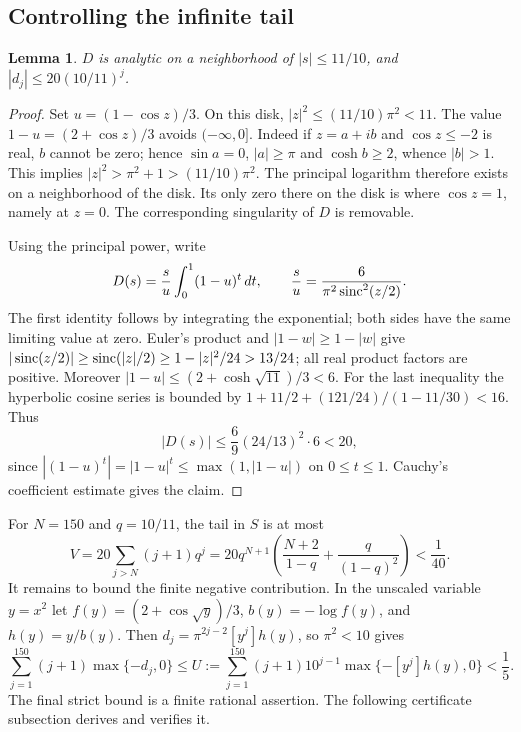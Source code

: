 \documentclass[11pt,a4paper]{article}
\newtheorem{SourceRceSlemma}{Lemma}
\begin{document}
\subsection{Controlling the infinite tail}
\begin{SourceRceSlemma}
$D$ is analytic on a neighborhood of $|s|\le 11/10$, and $|d_j|\le20(10/11)^j$.
\end{SourceRceSlemma}
\begin{proof}
Set $u=(1-\cos z)/3$. On this disk, $|z|^2\le (11/10)\pi^2<11$. The value $1-u=(2+\cos z)/3$ avoids $(-\infty,0]$. Indeed if $z=a+ib$ and $\cos z\le-2$ is real, $b$ cannot be zero; hence $\sin a=0$, $|a|\ge\pi$ and $\cosh b\ge2$, whence $|b|>1$. This implies $|z|^2>\pi^2+1>(11/10)\pi^2$. The principal logarithm therefore exists on a neighborhood of the disk. Its only zero there on the disk is where $\cos z=1$, namely at $z=0$. The corresponding singularity of $D$ is removable.

Using the principal power, write
\[
 D(s)=\frac{s}{u}\int_0^1(1-u)^t\,dt,\qquad
 \frac{s}{u}=\frac{6}{\pi^2\operatorname{sinc}^2(z/2)} .
\]
The first identity follows by integrating the exponential; both sides have the same limiting value at zero. Euler's product and $|1-w|\ge1-|w|$ give
$|\operatorname{sinc}(z/2)|\ge\operatorname{sinc}(|z|/2)\ge 1-|z|^2/24>13/24$; all real product factors are positive. Moreover $|1-u|\le(2+\cosh\sqrt{11})/3<6$. For the last inequality the hyperbolic cosine series is bounded by $1+11/2+(121/24)/(1-11/30)<16$. Thus
\[
 |D(s)|\le\frac{6}{9}(24/13)^2\cdot6<20,
\]
since $|(1-u)^t|=|1-u|^t\le\max(1,|1-u|)$ on $0\le t\le1$. Cauchy's coefficient estimate gives the claim.
\end{proof}
For $N=150$ and $q=10/11$, the tail in $S$ is at most
\[
 V=20\sum_{j>N}(j+1)q^j
   =20q^{N+1}\left(\frac{N+2}{1-q}+\frac{q}{(1-q)^2}\right)<\frac1{40}.
\]
It remains to bound the finite negative contribution. In the unscaled variable $y=x^2$ let $f(y)=(2+\cos\sqrt y)/3$, $b(y)=-\log f(y)$, and $h(y)=y/b(y)$. Then $d_j=\pi^{2j-2}[y^j]h(y)$, so $\pi^2<10$ gives
\[
 \sum_{j=1}^{150}(j+1)\max\{-d_j,0\}\le
 U:=\sum_{j=1}^{150}(j+1)10^{j-1}\max\{-[y^j]h(y),0\}<\frac15.
\]
The final strict bound is a finite rational assertion. The following certificate subsection derives and verifies it.
\end{document}
